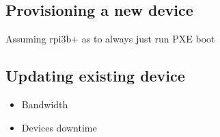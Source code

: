 \documentclass[../../main.tex]{subfiles}
\begin{document}
\subsection{Provisioning a new device}%
\label{sub:provisioning_a_new_device}
Assuming rpi3b+ as to always just run PXE boot

\subsection{Updating existing device}%
\label{sub:updating_existing_device}

\begin{itemize}
	\item Bandwidth
	\item Devices downtime
\end{itemize}


	
\end{document}
